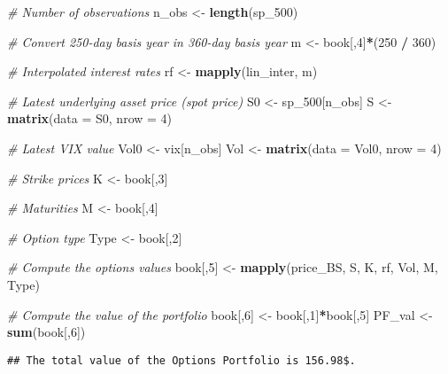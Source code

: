 \documentclass[]{article}
\newenvironment{Shaded}{\begin{snugshade}}{\end{snugshade}}
\newcommand{\CommentTok}[1]{\textcolor[rgb]{0.56,0.35,0.01}{\textit{#1}}}
\newcommand{\DataTypeTok}[1]{\textcolor[rgb]{0.13,0.29,0.53}{#1}}
\newcommand{\DecValTok}[1]{\textcolor[rgb]{0.00,0.00,0.81}{#1}}
\newcommand{\KeywordTok}[1]{\textcolor[rgb]{0.13,0.29,0.53}{\textbf{#1}}}
\newcommand{\NormalTok}[1]{#1}
\newcommand{\OperatorTok}[1]{\textcolor[rgb]{0.81,0.36,0.00}{\textbf{#1}}}
\newcommand{\StringTok}[1]{\textcolor[rgb]{0.31,0.60,0.02}{#1}}
\begin{document}
\begin{Shaded}
\begin{Highlighting}[]
\CommentTok{\# Number of observations}
\NormalTok{n\_obs <{-}}\StringTok{ }\KeywordTok{length}\NormalTok{(sp\_}\DecValTok{500}\NormalTok{)}

\CommentTok{\# Convert 250{-}day basis year in 360{-}day basis year}
\NormalTok{m <{-}}\StringTok{ }\NormalTok{book[,}\DecValTok{4}\NormalTok{]}\OperatorTok{*}\NormalTok{(}\DecValTok{250} \OperatorTok{/}\StringTok{ }\DecValTok{360}\NormalTok{)}

\CommentTok{\# Interpolated interest rates}
\NormalTok{rf <{-}}\StringTok{ }\KeywordTok{mapply}\NormalTok{(lin\_inter, m)}

\CommentTok{\# Latest underlying asset price (spot price)}
\NormalTok{S0 <{-}}\StringTok{ }\NormalTok{sp\_}\DecValTok{500}\NormalTok{[n\_obs]}
\NormalTok{S <{-}}\StringTok{ }\KeywordTok{matrix}\NormalTok{(}\DataTypeTok{data =}\NormalTok{ S0, }\DataTypeTok{nrow =} \DecValTok{4}\NormalTok{)}

\CommentTok{\# Latest VIX value}
\NormalTok{Vol0 <{-}}\StringTok{ }\NormalTok{vix[n\_obs]}
\NormalTok{Vol <{-}}\StringTok{ }\KeywordTok{matrix}\NormalTok{(}\DataTypeTok{data =}\NormalTok{ Vol0, }\DataTypeTok{nrow =} \DecValTok{4}\NormalTok{)}

\CommentTok{\# Strike prices}
\NormalTok{K <{-}}\StringTok{ }\NormalTok{book[,}\DecValTok{3}\NormalTok{]}

\CommentTok{\# Maturities}
\NormalTok{M <{-}}\StringTok{ }\NormalTok{book[,}\DecValTok{4}\NormalTok{]}

\CommentTok{\# Option type}
\NormalTok{Type <{-}}\StringTok{ }\NormalTok{book[,}\DecValTok{2}\NormalTok{]}

\CommentTok{\# Compute the options values}
\NormalTok{book[,}\DecValTok{5}\NormalTok{] <{-}}\StringTok{ }\KeywordTok{mapply}\NormalTok{(price\_BS, S, K, rf, Vol, M, Type)}

\CommentTok{\# Compute the value of the portfolio}
\NormalTok{book[,}\DecValTok{6}\NormalTok{] <{-}}\StringTok{ }\NormalTok{book[,}\DecValTok{1}\NormalTok{]}\OperatorTok{*}\NormalTok{book[,}\DecValTok{5}\NormalTok{]}
\NormalTok{PF\_val   <{-}}\StringTok{ }\KeywordTok{sum}\NormalTok{(book[,}\DecValTok{6}\NormalTok{])}
\end{Highlighting}
\end{Shaded}

\begin{verbatim}
## The total value of the Options Portfolio is 156.98$.
\end{verbatim}
\end{document}
